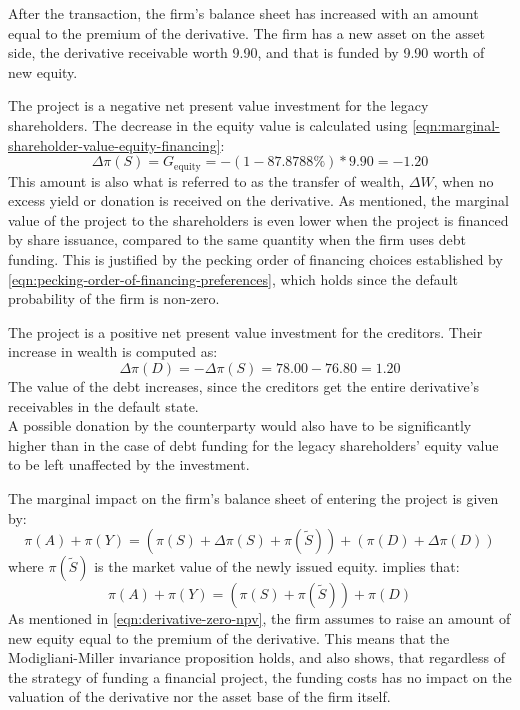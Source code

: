 \documentclass[main.tex]{subfiles}
\begin{document}
        After the transaction, the firm's balance sheet has increased with an amount equal to the premium of the derivative. 
        The firm has a new asset on the asset side, the derivative receivable worth 9.90, and that is funded by 9.90 worth of new equity.

        The project is a negative net present value investment for the legacy shareholders. 
        The decrease in the equity value is calculated using
        \cref{eqn:marginal-shareholder-value-equity-financing}:
        \begin{equation}
                \Delta \pi(S) 
            =  
                G_{\text{equity}}
            =
                - (1 - 87.8788\%) * 9.90
            = 
                -1.20
        \end{equation}
        This amount is also what is referred to as the transfer of wealth, $\Delta W$, when no excess yield or donation is received on the derivative. 
        As mentioned, the marginal value of the project to the shareholders is even lower when the project is financed by share issuance,
        compared to the same quantity when the firm uses debt funding.
        This is justified by the pecking order of financing choices established by
        \cref{eqn:pecking-order-of-financing-preferences}, 
        which holds since the default probability of the firm is non-zero.

        The project is a positive net present value investment for the creditors. 
        Their increase in wealth is computed as:
        \begin{equation}\label{eqn:wealth-transfer-equality}
            \Delta \pi(D) = -\Delta \pi(S) = 78.00 - 76.80 = 1.20
        \end{equation}
        The value of the debt increases, since the creditors get the entire derivative's receivables in the default state.\\
        A possible donation by the counterparty would also have to be significantly higher than in the case of debt funding for the legacy shareholders' equity value to be left unaffected by the investment. 

        The marginal impact on the firm's balance sheet of entering the project is given by:
        \begin{equation}
            \pi(A) + \pi(Y) = (\pi(S) + \Delta \pi(S) + \pi(\tilde{S})) + (\pi(D) + \Delta \pi(D))
        \end{equation}
        where $\pi(\tilde{S})$ is the market value of the newly issued equity. 
         implies that:
        \begin{equation}
            \pi(A) + \pi(Y) = (\pi(S) + \pi(\tilde{S})) + \pi(D)
        \end{equation}
        As mentioned in \cref{eqn:derivative-zero-npv}, the firm assumes to raise an amount of new equity equal to the premium of the derivative. 
        This means that the Modigliani-Miller invariance proposition holds, and also shows, that regardless of the strategy of funding a financial project, the funding costs has no impact on the valuation of the derivative nor the asset base of the firm itself.
\end{document}
